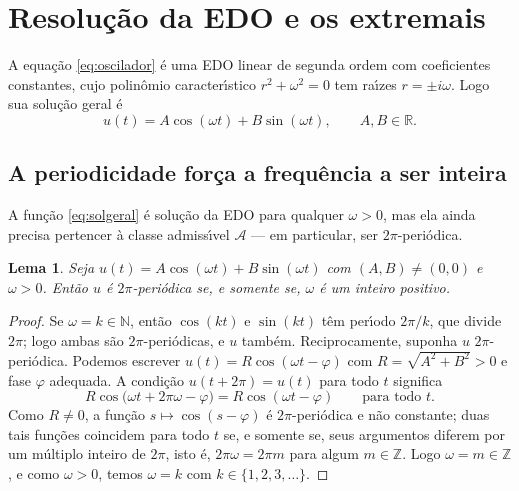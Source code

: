 \documentclass[11pt,a4paper]{amsart}
\newcommand{\R}{\mathbb{R}}
\newcommand{\Z}{\mathbb{Z}}
\newcommand{\N}{\mathbb{N}}
\newcommand{\Adm}{\mathcal{A}}
\theoremstyle{plain}
\newtheorem{lema}[teorema]{Lema}
\theoremstyle{definition}
\theoremstyle{remark}
\begin{document}
\section{Resolu\c{c}\~ao da EDO e os extremais}
\label{sec:edo}

A equa\c{c}\~ao \eqref{eq:oscilador} \'e uma EDO linear de segunda ordem com
coeficientes constantes, cujo polin\^omio caracter\'\i stico $r^2+\omega^2=0$
tem ra\'\i zes $r=\pm i\omega$. Logo sua solu\c{c}\~ao geral \'e
\begin{equation}\label{eq:solgeral}
  u(t) = A\cos(\omega t) + B\sin(\omega t),
  \qquad A,B\in\R .
\end{equation}

\subsection{A periodicidade for\c{c}a a frequ\^encia a ser inteira}

A fun\c{c}\~ao \eqref{eq:solgeral} \'e solu\c{c}\~ao da EDO para qualquer
$\omega>0$, mas ela ainda precisa pertencer \`a classe admiss\'\i vel
$\Adm$ --- em particular, ser $2\pi$-peri\'odica.

\begin{lema}\label{lema:freq}
Seja $u(t)=A\cos(\omega t)+B\sin(\omega t)$ com $(A,B)\neq(0,0)$ e $\omega>0$.
Ent\~ao $u$ \'e $2\pi$-peri\'odica se, e somente se, $\omega$ \'e um inteiro
positivo.
\end{lema}

\begin{proof}
Se $\omega=k\in\N$, ent\~ao $\cos(kt)$ e $\sin(kt)$ t\^em per\'\i odo
$2\pi/k$, que divide $2\pi$; logo ambas s\~ao $2\pi$-peri\'odicas, e $u$
tamb\'em. Reciprocamente, suponha $u$ $2\pi$-peri\'odica. Podemos escrever
$u(t)=R\cos(\omega t - \varphi)$ com $R=\sqrt{A^2+B^2}>0$ e fase $\varphi$
adequada. A condi\c{c}\~ao $u(t+2\pi)=u(t)$ para todo $t$ significa
\[
  R\cos\big(\omega t + 2\pi\omega - \varphi\big) = R\cos(\omega t - \varphi)
  \qquad\text{para todo }t .
\]
Como $R\neq 0$, a fun\c{c}\~ao $s\mapsto \cos(s-\varphi)$ \'e $2\pi$-peri\'odica
e n\~ao constante; duas tais fun\c{c}\~oes coincidem para todo $t$ se, e
somente se, seus argumentos diferem por um m\'ultiplo inteiro de $2\pi$, isto
\'e, $2\pi\omega = 2\pi m$ para algum $m\in\Z$. Logo $\omega = m\in\Z$, e como
$\omega>0$, temos $\omega=k$ com $k\in\{1,2,3,\dots\}$.
\end{proof}
\end{document}
